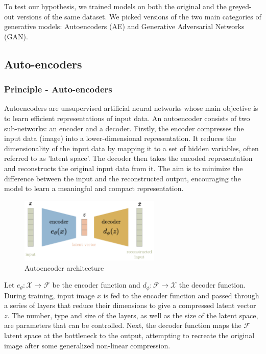\documentclass{article}
\begin{document}
To test our hypothesis, we trained models on both the original and the greyed-out versions of the same dataset. 
We picked versions of the two main categories of generative models: Autoencoders (AE) and Generative Adversarial Networks (GAN).

\subsection{Auto-encoders}
\subsubsection*{Principle - Auto-encoders}

\quad Autoencoders are unsupervised artificial neural networks whose main objective is to learn efficient representations of input data. 
An autoencoder consists of two sub-networks: an encoder and a decoder. 
Firstly, the encoder compresses the input data (image) into a lower-dimensional representation. 
It reduces the dimensionality of the input data by mapping it to a set of hidden variables, often referred to as 'latent space'. 
The decoder then takes the encoded representation and reconstructs the original input data from it. 
The aim is to minimize the difference between the input and the reconstructed output, encouraging the model to learn a meaningful and compact representation.

\begin{figure}[H]
    \centering
    \includegraphics[width=0.6\textwidth]{images/ae.png}
    \caption{Autoencoder architecture}
\end{figure}

Let $e_{\theta}:\mathcal{X}\to \mathcal{F}$ be the encoder function and $d_{\phi}:\mathcal{F}\to \mathcal{X}$ the decoder function. 
During training, input image $x$ is fed to the encoder function and passed through a series of layers that reduce their dimensions to give a compressed latent vector $z$. 
The number, type and size of the layers, as well as the size of the latent space, are parameters that can be controlled. 
Next, the decoder function maps the $\mathcal{F}$ latent space at the bottleneck to the output, attempting to recreate the original image after some generalized non-linear compression. 
\end{document}
